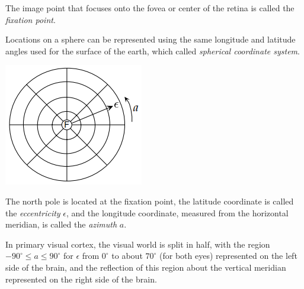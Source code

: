\begin{defn}
  \label{def:fixationPoint}
  The image point that focuses onto the fovea or center of the retina is called the \emph{fixation point}.
\end{defn}

\begin{defn}
  \label{def:sphericalCoord}
  Locations on a sphere can be represented using the same longitude and latitude angles used for the surface of the earth, which called \emph{spherical coordinate system}.
  \begin{center}
    \includegraphics[scale=0.4]{./png/sphericalCoord}
  \end{center}
  The north pole is located at the fixation point, the latitude coordinate is called the \emph{eccentricity} $\epsilon$, and the longitude coordinate, measured from the horizontal meridian, is called the \emph{azimuth} $a$.
\end{defn}

\begin{prin}
  \label{prin:primaryVisualCortexRepresent}
  In primary visual cortex, the visual world is split in half, with the region $-90^{\circ} \leq a \leq 90^{\circ}$ for $\epsilon$ from $0^{\circ}$ to about $70^{\circ}$ (for both eyes) represented on the left side of the brain, and the reflection of this region about the vertical meridian represented on the right side of the brain.
\end{prin}


